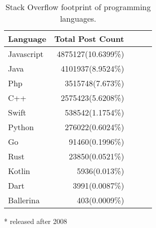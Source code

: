 \begin{table}
\centering
\caption{Stack Overflow footprint of programming languages.}
\begin{threeparttable}
\begin{tabular}{|l|r|r|r|r|}
\hline
Language   & Total Post Count   \\ \hline
Javascript & 4875127(10.6399\%) \\ \hline
Java       & 4101937(8.9524\%)  \\ \hline
Php        & 3515748(7.673\%)   \\ \hline
C++        & 2575423(5.6208\%)  \\ \hline
Swift\tnote{*}      & 538542(1.1754\%)   \\ \hline
Python     & 276022(0.6024\%)   \\ \hline
Go\tnote{*}         & 91460(0.1996\%)    \\ \hline
Rust\tnote{*}       & 23850(0.0521\%)    \\ \hline
Kotlin\tnote{*}     & 5936(0.013\%)      \\ \hline
Dart\tnote{*}       & 3991(0.0087\%)     \\ \hline
Ballerina\tnote{*}  & 403(0.0009\%)      \\ \hline
\end{tabular}
\begin{tablenotes}
\item [*] released after 2008

\end{tablenotes}


\end{threeparttable}
\label{table:language stats}
\end{table}


